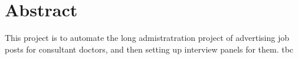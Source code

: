 \chapter*{\centering Abstract}
This project is to automate the long admistratration project of advertising job posts for consultant doctors, and then setting up interview panels for them. tbc